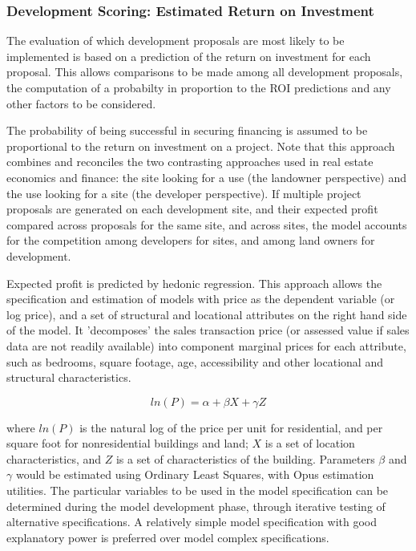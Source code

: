 \subsubsection{Development Scoring: Estimated Return on Investment}
The evaluation of which development proposals are most likely to be implemented is based on
a prediction of the return on investment for each proposal.  This allows comparisons to be made 
among all development proposals, the computation of a probabilty in proportion to the ROI
predictions and any other factors to be considered.

The probability of being successful in securing financing is assumed to be proportional
to the return on investment on a project.  Note that this
approach combines and reconciles the two contrasting approaches used in real estate economics and
finance: the site looking for a use (the landowner perspective) and the use looking for a site (the developer 
perspective).  If multiple project proposals are generated on each development site,
and their expected profit compared across proposals for the same site, and across
sites, the model accounts for the competition among developers for sites, and
among land owners for development.  

Expected profit is predicted by hedonic regression.  This
approach allows the specification and estimation
of models with price as the dependent variable (or log price), and a set of structural and locational
attributes on the right hand side of the model.  It 'decomposes' the sales transaction
price (or assessed value if sales data are not readily available) into component marginal prices for
each attribute, such as bedrooms, square footage, age, accessibility and other locational
and structural characteristics.

\begin{equation}
ln(P) = \alpha + \beta X + \gamma Z
\end{equation}

where $ln(P)$ is the natural log of the price per unit for residential, and per square foot for nonresidential 
buildings and land; $X$ is a set of location characteristics, and $Z$ is a set of characteristics of the 
building.  Parameters $\beta$ and $\gamma$ would be estimated using Ordinary Least Squares, with Opus
estimation utilities.  The particular variables to be used in the model specification can be determined
during the model development phase, through iterative testing of alternative specifications.  A relatively
simple model specification with good explanatory power is preferred over model complex specifications.

